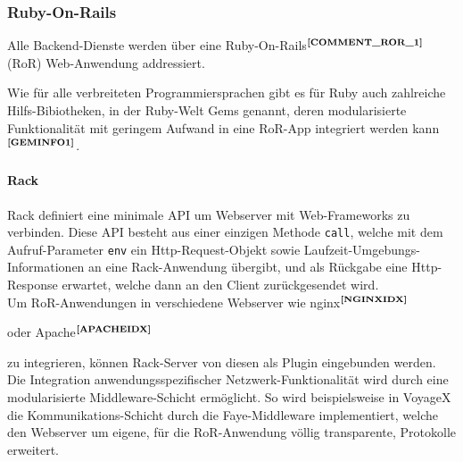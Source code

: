 \subsubsection{Ruby-On-Rails}
Alle Backend-Dienste werden über eine Ruby-On-Rails$^{\textbf{\ref{COMMENT_ROR_1}}}$ (RoR) Web-Anwendung addressiert.%
\addtocounter{footnote}{1}
%
Wie für alle verbreiteten Programmiersprachen gibt es für Ruby auch zahlreiche Hilfs-Bibiotheken, in der Ruby-Welt Gems genannt, deren modularisierte Funktionalität mit geringem Aufwand in eine RoR-App integriert werden kann $^{\textbf{\ref{GEMINFO1}}}$.
\addtocounter{footnote}{1}%
%

\paragraph{Rack}
Rack definiert eine minimale API um Webserver mit Web-Frameworks zu verbinden.\cite{RACK:INTRO}
Diese API besteht aus einer einzigen Methode \texttt{call}, welche mit dem Aufruf-Parameter \texttt{env} ein Http-Request-Objekt sowie Laufzeit-Umgebungs-Informationen an eine Rack-Anwendung übergibt, und als Rückgabe eine Http-Response erwartet, welche dann an den Client zurückgesendet wird.\\
Um RoR-Anwendungen in verschiedene Webserver wie nginx$^{\textbf{\ref{NGINXIDX}}}$%
\addtocounter{footnote}{1}%
oder Apache$^{\textbf{\ref{APACHEIDX}}}$%
\addtocounter{footnote}{1}%
zu integrieren, können Rack-Server von diesen als Plugin eingebunden werden. Die Integration anwendungsspezifischer Netzwerk-Funktionalität wird durch eine modularisierte Middleware-Schicht ermöglicht. So wird beispielsweise in VoyageX die Kommunikations-Schicht durch die Faye-Middleware implementiert, welche den Webserver um eigene, für die RoR-Anwendung völlig transparente, Protokolle erweitert.\\

